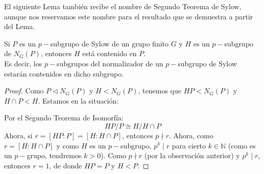 \noindent
El siguiente Lema también recibe el nombre de Segundo Teorema de Sylow, aunque nos reservamos este nombre para el resultado que se demuestra a partir del Lema.
\begin{lema}
    Si $P$ es un $p-$subgrupo de Sylow de un grupo finito $G$ y $H$ es un $p-$subgrupo de $N_G(P)$, entonces $H$ está contenido en $P$.\\

    \noindent
    Es decir, los $p-$subgrupos del normalizador de un $p-$subgrupo de Sylow estarán contenidos en dicho subgrupo. 
    \begin{proof}
        Como $P\lhd N_G(P)$ y $H<N_G(P)$, tenemos que $HP < N_G(P)$ y $H\cap P < H$. Estamos en la situación:
        \begin{figure}[H]
            \centering
        \end{figure}
        \noindent
        Por el Segundo Teorema de Isomorfía:
        \begin{equation*}
            HP/P \cong H/H\cap P
        \end{equation*}
        Ahora, si $r = [HP:P] = [H:H\cap P]$, entonces $p\nmid r$. Ahora, como $r = [H:H\cap P]$ y como $H$ es un $p-$subgrupo, $p^k \mid r$ para cierto $k\in \mathbb{N}$ (como es un $p-$grupo, tendremos $k>0$). Como $p\nmid r$ (por la observación anterior) y $p^k \mid r$, entonces $r = 1$, de donde $HP = P$ y $H<P$.
    \end{proof}
\end{lema}

